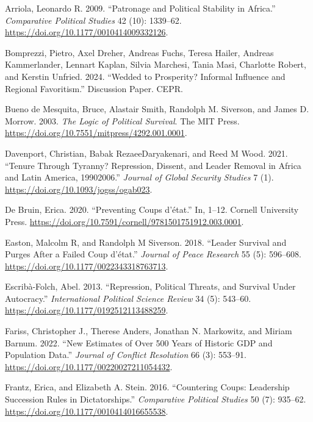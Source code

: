 \documentclass[
  12pt,
]{article}
\newlength{\cslhangindent}
\newenvironment{CSLReferences}[2] %
 {\begin{list}{}{%
  \setlength{\itemindent}{0pt}
  \setlength{\leftmargin}{0pt}
  \setlength{\parsep}{0pt}
  \ifodd #1
   \setlength{\leftmargin}{\cslhangindent}
   \setlength{\itemindent}{-1\cslhangindent}
  \fi
  \setlength{\itemsep}{#2\baselineskip}}}
 {\end{list}}
\begin{document}
\label{refs}
\begin{CSLReferences}{1}{0}
Arriola, Leonardo R. 2009. {``Patronage and Political Stability in
Africa.''} \emph{Comparative Political Studies} 42 (10): 1339--62.
\url{https://doi.org/10.1177/0010414009332126}.

Bomprezzi, Pietro, Axel Dreher, Andreas Fuchs, Teresa Hailer, Andreas
Kammerlander, Lennart Kaplan, Silvia Marchesi, Tania Masi, Charlotte
Robert, and Kerstin Unfried. 2024. {``Wedded to Prosperity? Informal
Influence and Regional Favoritism.''} Discussion Paper. CEPR.

Bueno de Mesquita, Bruce, Alastair Smith, Randolph M. Siverson, and
James D. Morrow. 2003. \emph{The Logic of Political Survival}. The MIT
Press. \url{https://doi.org/10.7551/mitpress/4292.001.0001}.

Davenport, Christian, Babak RezaeeDaryakenari, and Reed M Wood. 2021.
{``Tenure Through Tyranny? Repression, Dissent, and Leader Removal in
Africa and Latin America, 1990{\textendash}2006.''} \emph{Journal of
Global Security Studies} 7 (1).
\url{https://doi.org/10.1093/jogss/ogab023}.

De Bruin, Erica. 2020. {``Preventing Coups d{'}état.''} In, 1--12.
Cornell University Press.
\url{https://doi.org/10.7591/cornell/9781501751912.003.0001}.

Easton, Malcolm R, and Randolph M Siverson. 2018. {``Leader Survival and
Purges After a Failed Coup d{'}état.''} \emph{Journal of Peace Research}
55 (5): 596--608. \url{https://doi.org/10.1177/0022343318763713}.

Escribà-Folch, Abel. 2013. {``Repression, Political Threats, and
Survival Under Autocracy.''} \emph{International Political Science
Review} 34 (5): 543--60. \url{https://doi.org/10.1177/0192512113488259}.

Fariss, Christopher J., Therese Anders, Jonathan N. Markowitz, and
Miriam Barnum. 2022. {``New Estimates of Over 500 Years of Historic GDP
and Population Data.''} \emph{Journal of Conflict Resolution} 66 (3):
553--91. \url{https://doi.org/10.1177/00220027211054432}.

Frantz, Erica, and Elizabeth A. Stein. 2016. {``Countering Coups:
Leadership Succession Rules in Dictatorships.''} \emph{Comparative
Political Studies} 50 (7): 935--62.
\url{https://doi.org/10.1177/0010414016655538}.


\end{CSLReferences}
\end{document}
